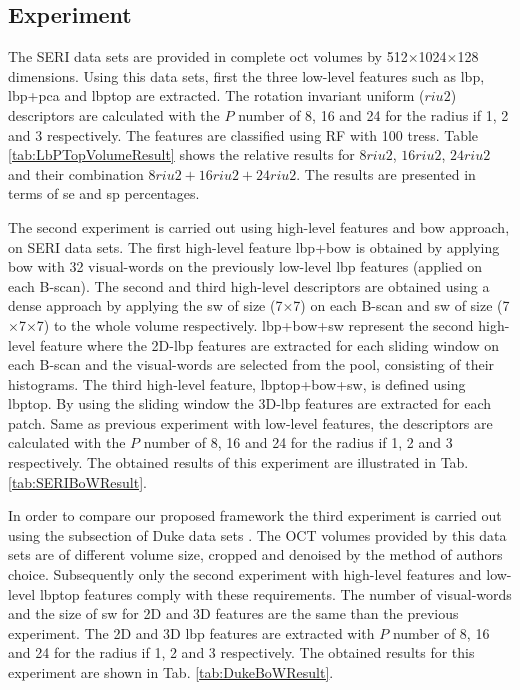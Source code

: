 \subsection{Experiment}
The SERI data sets are provided in complete \ac{oct} volumes by 512$\times$1024$\times$128 dimensions. Using this data sets, first the three low-level features such as \ac{lbp}, \ac{lbp}+\ac{pca} and \ac{lbptop} are extracted. The rotation invariant uniform ($riu2$) descriptors are calculated with the $P$ number of 8, 16 and 24 for the radius if 1, 2 and 3 respectively. The features are classified using RF with 100 tress. Table \ref{tab:LbPTopVolumeResult} shows the relative results for $8riu2$, $16riu2$, $24riu2$ and their combination $8riu2 + 16riu2 + 24riu2$. The results are presented in terms of \ac{se} and \ac{sp} percentages.  

The second experiment is carried out using high-level features and \ac{bow} approach, on SERI data sets. The first high-level feature \ac{lbp}+\ac{bow} is obtained by applying \ac{bow} with 32 visual-words on the previously low-level \ac{lbp} features (applied on each B-scan). The second and third high-level descriptors are obtained using a dense approach by applying the \ac{sw} of size (7$\times$7) on each B-scan and \ac{sw} of size (7$\times$7$\times$7) to the whole volume respectively. \ac{lbp}+\ac{bow}+\ac{sw} represent the second high-level feature where the 2D-\ac{lbp} features are extracted for each sliding window on each B-scan and the visual-words are selected from the pool, consisting of their histograms. The third high-level feature, \ac{lbptop}+\ac{bow}+\ac{sw}, is defined using \ac{lbptop}. By using the sliding window the 3D-\ac{lbp} features are extracted for each patch. Same as previous experiment with low-level features, the descriptors are calculated with the $P$ number of 8, 16 and 24 for the radius if 1, 2 and 3 respectively. The obtained results of this experiment are illustrated in Tab. \ref{tab:SERIBoWResult}. 

In order to compare our proposed framework the third experiment is carried out using the subsection of Duke data sets \cite{Srinivasan2014}. The OCT volumes provided by this data sets are of different volume size, cropped and denoised by the method of authors choice. Subsequently only the second experiment with high-level features and low-level \ac{lbptop} features comply with these requirements. The number of visual-words and the size of \ac{sw} for 2D and 3D features are the same than the previous experiment. The 2D and 3D \ac{lbp} features are extracted with $P$ number of 8, 16 and 24 for the radius if 1, 2 and 3 respectively. The obtained results for this experiment are shown in Tab. \ref{tab:DukeBoWResult}.

